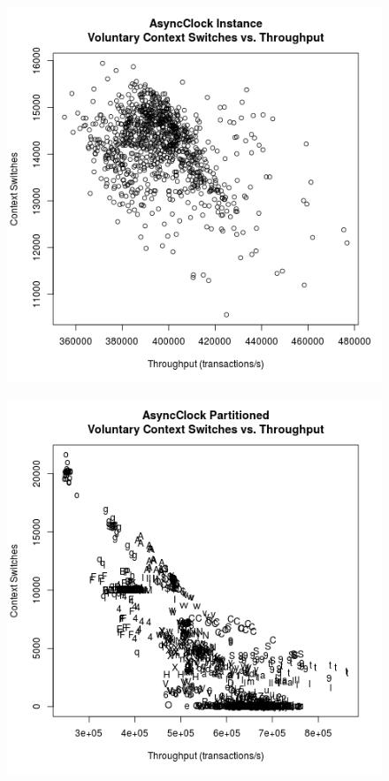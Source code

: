 \begin{figure}
\center
\includegraphics[height=.4\textheight]{async_instance_throughput_context.png}
\caption{\label{async_instance_throughput_context}}
\end{figure}

\begin{figure}
\center
\includegraphics[height=.4\textheight]{async_partitioned_throughput_context.png}
\caption{\label{async_partitioned_throughput_context}}
\end{figure}

